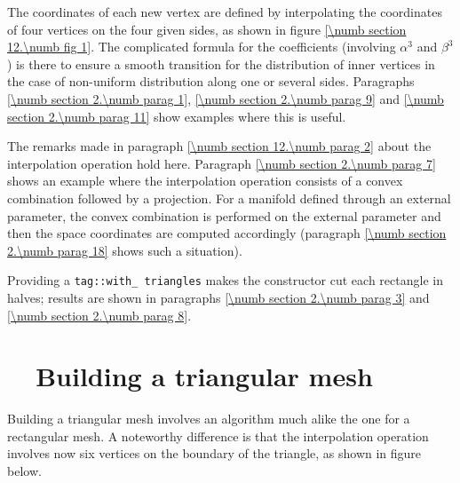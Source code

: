The coordinates of each new vertex are defined by interpolating the coordinates of four vertices
on the four given sides, as shown in figure \ref{\numb section 12.\numb fig 1}.
The complicated formula for the coefficients (involving $ \alpha^3 $ and $ \beta^3 $) is there
to ensure a smooth transition for the distribution of inner vertices in the case of non-uniform
distribution along one or several sides.
Paragraphs \ref{\numb section 2.\numb parag 1}, \ref{\numb section 2.\numb parag 9} and
\ref{\numb section 2.\numb parag 11} show examples where this is useful.

The remarks made in paragraph \ref{\numb section 12.\numb parag 2} about
the interpolation operation hold here.
Paragraph \ref{\numb section 2.\numb parag 7} shows an example where the interpolation operation
consists of a convex combination followed by a projection.
For a manifold defined through an external parameter, the convex combination is performed
on the external parameter and then the space coordinates are computed accordingly
(paragraph \ref{\numb section 2.\numb parag 18} shows such a situation).

Providing a {\small\tt \textcolor{tag}{tag}::with\_\,triangles} makes the constructor cut each rectangle
in halves; results are shown in paragraphs \ref{\numb section 2.\numb parag 3} and
\ref{\numb section 2.\numb parag 8}.


\section{~~Building a triangular mesh}\label{\numb section 12.\numb parag 4}

Building a triangular mesh involves an algorithm much alike the one for a rectangular mesh.
A noteworthy difference is that the interpolation operation involves now six vertices on
the boundary of the triangle, as shown in figure below.

